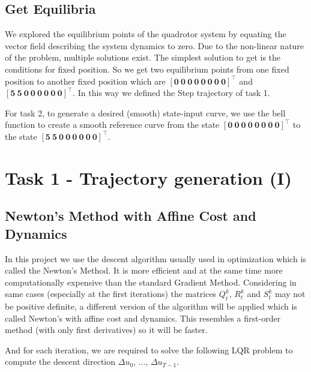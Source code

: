 \documentclass[a4paper,11pt,oneside]{book}
\begin{document}
\section{Get Equilibria}

We explored the equilibrium points of the quadrotor system by equating the vector field describing the system dynamics to zero. Due to the non-linear nature of the problem, multiple solutions exist. The simplest solution to get is the conditions for fixed position. So we get two equilibrium points from one fixed position to another fixed position which are $\mathbf{[ 0\ 0\ 0\ 0\ 0\ 0\ 0\ 0 ]}^\top$ and $\mathbf{[ 5\ 5\ 0\ 0\ 0\ 0\ 0\ 0 ]}^\top$. In this way we defined the Step trajectory of task 1.

For task 2, to generate a desired (smooth) state-input curve, we use the bell function to create a smooth reference curve from the state $\mathbf{[ 0\ 0\ 0\ 0\ 0\ 0\ 0\ 0 ]}^\top$ to the state $\mathbf{[ 5\ 5\ 0\ 0\ 0\ 0\ 0\ 0 ]}^\top$. 


\chapter{Task 1 - Trajectory generation (I)}
\section{Newton's Method with Affine Cost and Dynamics}

In this project we use the descent algorithm usually used in optimization which is called the Newton's Method. It is more efficient and at the same time more computationally expensive than the standard Gradient Method. Considering in same cases (especially at the first iterations) the matrices $Q_t^{k}$, $R_t^{k}$ and $S_t^{k}$ may not be positive definite, a different version of the algorithm will be applied which is called Newton's with affine cost and dynamics. This resembles a first-order method (with only first derivatives) so it will be faster.

And for each iteration, we are required to solve the following LQR problem to compute the descent direction $\Delta u_0$, ..., $\Delta u_{T-1}$.
\end{document}
